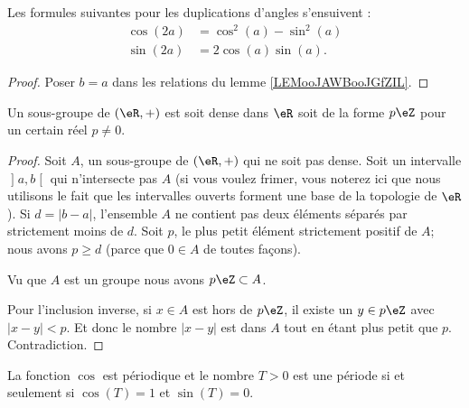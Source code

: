 \begin{corollary}       \label{CORooQZDQooWjMXTF}
    Les formules suivantes pour les duplications d'angles s'ensuivent : 
    \begin{subequations}
        \begin{align}
            \cos(2a)&=\cos^2(a)-\sin^2(a)\\
            \sin(2a)&=2\cos(a)\sin(a).
        \end{align}
    \end{subequations}
\end{corollary}

\begin{proof}
    Poser \( b=a\) dans les relations du lemme \ref{LEMooJAWBooJGfZIL}.
\end{proof}

\begin{lemma}       \label{LEMooPQWWooMdPWUT}
    Un sous-groupe de \( (\eR,+)\) est soit dense dans \( \eR\) soit de la forme \( p\eZ\) pour un certain réel \( p\neq 0\).
\end{lemma}

\begin{proof}
    Soit \( A\), un sous-groupe de \( (\eR,+)\) qui ne soit pas dense. Soit un intervalle \( \mathopen] a , b \mathclose[\) qui n'intersecte pas \( A\) (si vous voulez frimer, vous noterez ici que nous utilisons le fait que les intervalles ouverts forment une base de la topologie de \( \eR\)). Si \( d=| b-a |\), l'ensemble \( A\) ne contient pas deux éléments séparés par strictement moins de \( d\). Soit \( p\), le plus petit élément strictement positif de \( A\); nous avons \( p\geq d\) (parce que \( 0\in A\) de toutes façons).

        Vu que \( A\) est un groupe nous avons \( p\eZ\subset A\).

        Pour l'inclusion inverse, si \( x\in A\) est hors de \( p\eZ\), il existe un \( y\in p\eZ\) avec \( | x-y |<p\). Et donc le nombre \( | x-y |\) est dans \( A\) tout en étant plus petit que \( p\). Contradiction.
\end{proof}

\begin{proposition}      \label{PROPooFRVCooKSgYUM}
    La fonction \( \cos\) est périodique et le nombre \( T>0\) est une période si et seulement si \( \cos(T)=1\) et \( \sin(T)=0\).
\end{proposition}

